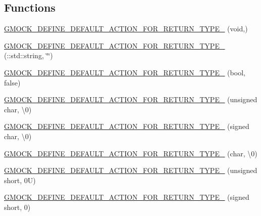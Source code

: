 \subsection*{Functions}
\begin{DoxyCompactItemize}
\item 
\hyperlink{namespacetesting_1_1internal_a8fe6f7c11d6d3dd6e42b75c9a5b43861}{G\+M\+O\+C\+K\+\_\+\+D\+E\+F\+I\+N\+E\+\_\+\+D\+E\+F\+A\+U\+L\+T\+\_\+\+A\+C\+T\+I\+O\+N\+\_\+\+F\+O\+R\+\_\+\+R\+E\+T\+U\+R\+N\+\_\+\+T\+Y\+P\+E\+\_\+} (void,)
\item 
\hyperlink{namespacetesting_1_1internal_a0a961f38f341d40237252babcb3767b7}{G\+M\+O\+C\+K\+\_\+\+D\+E\+F\+I\+N\+E\+\_\+\+D\+E\+F\+A\+U\+L\+T\+\_\+\+A\+C\+T\+I\+O\+N\+\_\+\+F\+O\+R\+\_\+\+R\+E\+T\+U\+R\+N\+\_\+\+T\+Y\+P\+E\+\_\+} (\+::std\+::string, \char`\"{}\char`\"{})
\item 
\hyperlink{namespacetesting_1_1internal_aa6670915f42119e4ba20d8cb74fc1eea}{G\+M\+O\+C\+K\+\_\+\+D\+E\+F\+I\+N\+E\+\_\+\+D\+E\+F\+A\+U\+L\+T\+\_\+\+A\+C\+T\+I\+O\+N\+\_\+\+F\+O\+R\+\_\+\+R\+E\+T\+U\+R\+N\+\_\+\+T\+Y\+P\+E\+\_\+} (bool, false)
\item 
\hyperlink{namespacetesting_1_1internal_ab203e2c4c54f2ca86439344347a3e43f}{G\+M\+O\+C\+K\+\_\+\+D\+E\+F\+I\+N\+E\+\_\+\+D\+E\+F\+A\+U\+L\+T\+\_\+\+A\+C\+T\+I\+O\+N\+\_\+\+F\+O\+R\+\_\+\+R\+E\+T\+U\+R\+N\+\_\+\+T\+Y\+P\+E\+\_\+} (unsigned char, \textquotesingle{}\textbackslash{}0\textquotesingle{})
\item 
\hyperlink{namespacetesting_1_1internal_aaedb3b1b5307625bc84dc660742da3c6}{G\+M\+O\+C\+K\+\_\+\+D\+E\+F\+I\+N\+E\+\_\+\+D\+E\+F\+A\+U\+L\+T\+\_\+\+A\+C\+T\+I\+O\+N\+\_\+\+F\+O\+R\+\_\+\+R\+E\+T\+U\+R\+N\+\_\+\+T\+Y\+P\+E\+\_\+} (signed char, \textquotesingle{}\textbackslash{}0\textquotesingle{})
\item 
\hyperlink{namespacetesting_1_1internal_aeaaa7101572f283fe70a85ad5e6c65dc}{G\+M\+O\+C\+K\+\_\+\+D\+E\+F\+I\+N\+E\+\_\+\+D\+E\+F\+A\+U\+L\+T\+\_\+\+A\+C\+T\+I\+O\+N\+\_\+\+F\+O\+R\+\_\+\+R\+E\+T\+U\+R\+N\+\_\+\+T\+Y\+P\+E\+\_\+} (char, \textquotesingle{}\textbackslash{}0\textquotesingle{})
\item 
\hyperlink{namespacetesting_1_1internal_ab2965a6078670393812e67f8e5fcb072}{G\+M\+O\+C\+K\+\_\+\+D\+E\+F\+I\+N\+E\+\_\+\+D\+E\+F\+A\+U\+L\+T\+\_\+\+A\+C\+T\+I\+O\+N\+\_\+\+F\+O\+R\+\_\+\+R\+E\+T\+U\+R\+N\+\_\+\+T\+Y\+P\+E\+\_\+} (unsigned short, 0\+U)
\item 
\hyperlink{namespacetesting_1_1internal_ae6ea5db83b290e2412f321c3b1eb8c47}{G\+M\+O\+C\+K\+\_\+\+D\+E\+F\+I\+N\+E\+\_\+\+D\+E\+F\+A\+U\+L\+T\+\_\+\+A\+C\+T\+I\+O\+N\+\_\+\+F\+O\+R\+\_\+\+R\+E\+T\+U\+R\+N\+\_\+\+T\+Y\+P\+E\+\_\+} (signed short, 0)

\end{DoxyCompactItemize}
